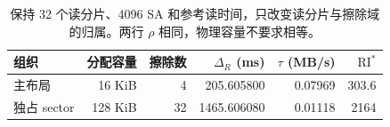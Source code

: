 \begin{table}[htbp]\centering\small
\begin{tabular}{@{}lrrrrr@{}}\toprule
组织 & 分配容量 & 擦除数 & $\Delta_R$ (ms) & $\tau$ (MB/s) & $\mathrm{RI}^{*}$\\\midrule
主布局 & 16 KiB & 4 & 205.605800 & 0.07969 & 303.6\\
独占 sector & 128 KiB & 32 & 1465.606080 & 0.01118 & 2164\\
\bottomrule\end{tabular}
\caption{保持 32 个读分片、4096 SA 和参考读时间，只改变读分片与擦除域的归属。两行 $\rho$ 相同，物理容量不要求相等。}\label{03_nor_2d:tab:nor-contrast}\end{table}
